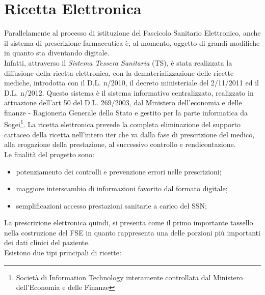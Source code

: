 \section{Ricetta Elettronica}
%
Parallelamente al processo di istituzione del Fascicolo Sanitario Elettronico, anche il sistema di prescrizione farmaceutica è, al momento, oggetto di grandi modifiche in quanto sta diventando digitale. \\
Infatti, attraverso il \emph{Sistema Tessera Sanitaria} (TS), è stata realizzata la diffusione della ricetta elettronica, con la \gls{dematerializzazione} delle ricette mediche, introdotta con il D.L. n/2010, il decreto ministeriale del 2/11/2011 ed il D.L. n/2012. \cite{agendadigitale} Questo sistema è il sistema informativo centralizzato, realizzato in attuazione dell'art 50 del D.L. 269/2003, dal Ministero dell'economia e delle finanze - Ragioneria Generale dello Stato e gestito per la parte informatica da Sogei\footnote{Società di Information Technology interamente controllata dal Ministero dell'Economia e delle Finanze}.
La ricetta elettronica prevede la completa eliminazione del supporto cartaceo della ricetta nell’intero iter che va dalla fase di prescrizione del medico, alla erogazione della prestazione, al successivo controllo e rendicontazione. \\
Le finalità del progetto sono:
\begin{itemize}
	\item potenziamento dei controlli e prevenzione errori nelle prescrizioni;
	\item maggiore interscambio di informazioni favorito dal formato digitale;
	\item semplificazioni accesso prestazioni sanitarie a carico del SSN;
\end{itemize}
La prescrizione elettronica quindi, si presenta come il primo importante tassello nella costruzione del FSE in quanto rappresenta una delle porzioni più importanti dei dati clinici del paziente.\\
Esistono due tipi principali di ricette:
